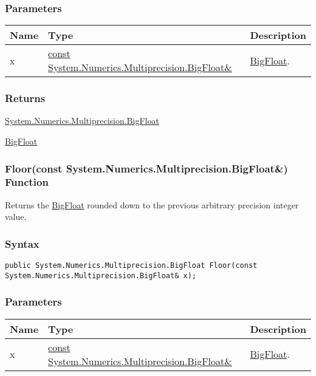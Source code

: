 \documentclass[a4paper,oneside,11.000000pt]{book}
\begin{document}
\subsubsection*{Parameters}
\begin{flushleft}
\begin{supertabular}[l]{!{\raggedright}p{1.30721cm}!{\raggedright}p{8.55945cm}!{\raggedright}p{2.65538cm}}
\textbf{Name}
& \textbf{Type}
& \textbf{Description}
\\
\hline
x
& \hyperlink{System.Numerics.Multiprecision.BigFloat}{const System.\-Numerics.\-Multiprecision.\-BigFloat\&\-}
& \hyperlink{System.Numerics.Multiprecision.BigFloat}{BigFloat}.

\\
\end{supertabular}

\end{flushleft}
\subsubsection*{Returns}
\hyperlink{System.Numerics.Multiprecision.BigFloat}{System.\-Numerics.\-Multiprecision.\-BigFloat}
\begin{flushleft}
\hyperlink{System.Numerics.Multiprecision.BigFloat}{BigFloat}

\end{flushleft}
\clearpage

\hypertarget{System.Numerics.Multiprecision.Floor.C.R.System.Numerics.Multiprecision.BigFloat}{\subsubsection*{Floor(const System.Numerics.Multiprecision.BigFloat\&) Function}}
\begin{flushleft}
Returns the \hyperlink{System.Numerics.Multiprecision.BigFloat}{BigFloat} rounded down to the previous arbitrary precision integer value.

\end{flushleft}
\subsubsection*{Syntax}
\texttt{public System.Numerics.Multiprecision.BigFloat Floor(const System.Numerics.Multiprecision.BigFloat\& x);}
\subsubsection*{Parameters}
\begin{flushleft}
\begin{supertabular}[l]{!{\raggedright}p{1.30721cm}!{\raggedright}p{8.55945cm}!{\raggedright}p{2.65538cm}}
\textbf{Name}
& \textbf{Type}
& \textbf{Description}
\\
\hline
x
& \hyperlink{System.Numerics.Multiprecision.BigFloat}{const System.\-Numerics.\-Multiprecision.\-BigFloat\&\-}
& \hyperlink{System.Numerics.Multiprecision.BigFloat}{BigFloat}.

\\
\end{supertabular}

\end{flushleft}
\end{document}

